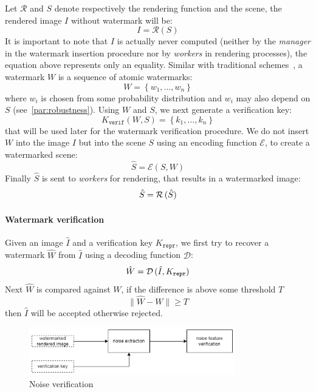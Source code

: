 Let $\mathcal{R}$ and $S$ denote respectively the rendering function and the scene, the rendered image $I$ without watermark will be:
\begin{equation*}
    I = \mathcal{R} \left( S \right)
\end{equation*}
It is important to note that $I$ is actually never computed (neither by the \emph{manager} in the watermark insertion procedure nor by \emph{workers} in rendering processes), the equation above represents only an equality. Similar with traditional schemes~\cite{Cox1999,Cox1997,Craver1997}, a watermark $W$ is a sequence of atomic watermarks:
\begin{equation*}
    W = \left\{ w_1,\dots,w_n \right\}
\end{equation*}
where $w_i$ is chosen from some probability distribution and $w_i$ may also depend on $S$ (see~\autoref{par:robustness}). Using $W$ and $S$, we next generate a verification key:
\begin{equation*}
    K_{\mathtt{verif}} \left(W,S\right) = \left\{ k_1,\dots,k_n \right\}
\end{equation*}
that will be used later for the watermark verification procedure. We do not insert $W$ into the image $I$ but into the scene $S$ using an encoding function $\mathcal{E}$, to create a watermarked scene:
\begin{equation*}
    \hat{S} = \mathcal{E} \left(S, W\right)
\end{equation*}
Finally $\hat{S}$ is sent to \emph{workers} for rendering, that results in a watermarked image:
\begin{equation*}
    \hat{S} = \mathcal{R} \thinspace (\hat{S})
\end{equation*}

\paragraph[Watermark verification]{Watermark verification}
Given an image $\hat{I}$ and a verification key $K_{\mathtt{repr}}$, we first try to recover a watermark $\hat{W}$ from $\hat{I}$ using a decoding function $\mathcal{D}$:
\begin{equation*}
    \hat{W} = \mathcal{D} \thinspace (\hat{I}, K_{\mathtt{repr}})
\end{equation*}
Next $\hat{W}$ is compared against $W$, if the difference is above some threshold $T$
\begin{equation*}
    \lVert \hat{W} - W \rVert \geq T
\end{equation*}
then $\hat{I}$ will be accepted otherwise rejected.
\begin{figure}[h]
    \centering
    \includegraphics[width=0.8\textwidth]{noise_verification.png}
    \caption[Noise verification]{Noise verification}
    \label{fig:noise_verification}
\end{figure}

